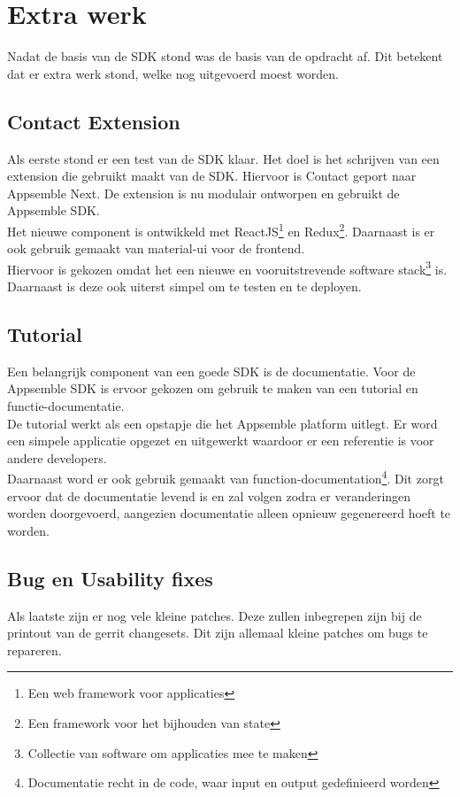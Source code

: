\chapter{Extra werk}

Nadat de basis van de SDK stond was de basis van de opdracht af. Dit betekent dat er extra werk stond, welke nog uitgevoerd moest worden. 

\section{Contact Extension}

Als eerste stond er een test van de SDK klaar. Het doel is het schrijven van een extension die gebruikt maakt van de SDK. Hiervoor is Contact geport naar Appsemble Next. De extension is nu modulair ontworpen en gebruikt de Appsemble SDK. \\

Het nieuwe component is ontwikkeld met ReactJS\footnote{Een web framework voor applicaties} en Redux\footnote{Een framework voor het bijhouden van state}. Daarnaast is er ook gebruik gemaakt van material-ui voor de frontend. \\

Hiervoor is gekozen omdat het een nieuwe en vooruitstrevende software stack\footnote{Collectie van software om applicaties mee te maken} is. Daarnaast is deze ook uiterst simpel om te testen en te deployen.

\section{Tutorial}

Een belangrijk component van een goede SDK is de documentatie. Voor de Appsemble SDK is ervoor gekozen om gebruik te maken van een tutorial en functie-documentatie. \\

De tutorial werkt als een opstapje die het Appsemble platform uitlegt. Er word een simpele applicatie opgezet en uitgewerkt waardoor er een referentie is voor andere developers. \\

Daarnaast word er ook gebruik gemaakt van function-documentation\footnote{Documentatie recht in de code, waar input en output gedefinieerd worden}. Dit zorgt ervoor dat de documentatie levend is en zal volgen zodra er veranderingen worden doorgevoerd, aangezien documentatie alleen opnieuw gegenereerd hoeft te worden.

\section{Bug en Usability fixes}

Als laatste zijn er nog vele kleine patches. Deze zullen inbegrepen zijn bij de printout van de gerrit changesets. Dit zijn allemaal kleine patches om bugs te repareren.